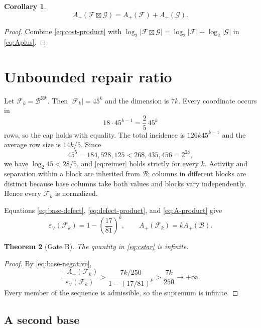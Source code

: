 \documentclass[11pt]{article}
\newtheorem{theorem}{Theorem}
\newtheorem{corollary}[theorem]{Corollary}
\theoremstyle{remark}
\newcommand{\F}{\mathcal F}
\newcommand{\G}{\mathcal G}
\newcommand{\B}{\mathcal B}
\newcommand{\eps}{\varepsilon}
\newcommand{\boxprod}{\mathbin{\boxtimes}}
\begin{document}
\begin{corollary}
\begin{equation}
 A_+(\F\boxprod\G)=A_+(\F)+A_+(\G).
 \label{eq:A-product}
\end{equation}
\end{corollary}
\begin{proof}
Combine \eqref{eq:cost-product} with
$\log_2|\F\boxprod\G|=\log_2|\F|+\log_2|\G|$ in \eqref{eq:Aplus}.
\end{proof}

\section{Unbounded repair ratio}

Let $\F_k=\B^{\boxprod k}$.  Then $|\F_k|=45^k$ and the dimension is $7k$.
Every coordinate occurs in
\[
 18\cdot45^{k-1}=\frac25\,45^k
\]
rows, so the cap holds with equality.  The total incidence is
$126k45^{k-1}$ and the average row size is $14k/5$.  Since
\[
 45^5=184{,}528{,}125<268{,}435{,}456=2^{28},
\]
we have $\log_2 45<28/5$, and \eqref{eq:reimer} holds strictly for every $k$.
Activity and separation within a block are inherited from $\B$; columns in
different blocks are distinct because base columns take both values and blocks
vary independently.  Hence every $\F_k$ is normalized.

Equations \eqref{eq:base-defect}, \eqref{eq:defect-product}, and
\eqref{eq:A-product} give
\[
 \eps_\vee(\F_k)=1-\left(\frac{17}{81}\right)^k,
 \qquad A_+(\F_k)=kA_+(\B).
\]

\begin{theorem}[Gate B]
\label{thm:main}
The quantity in \eqref{eq:cstar} is infinite.
\end{theorem}
\begin{proof}
By \eqref{eq:base-negative},
\[
 \frac{-A_+(\F_k)}{\eps_\vee(\F_k)}
 >\frac{7k/250}{1-(17/81)^k}
 >\frac{7k}{250}\longrightarrow+\infty.
\]
Every member of the sequence is admissible, so the supremum is infinite.
\end{proof}

\subsection{A second base}
\end{document}
